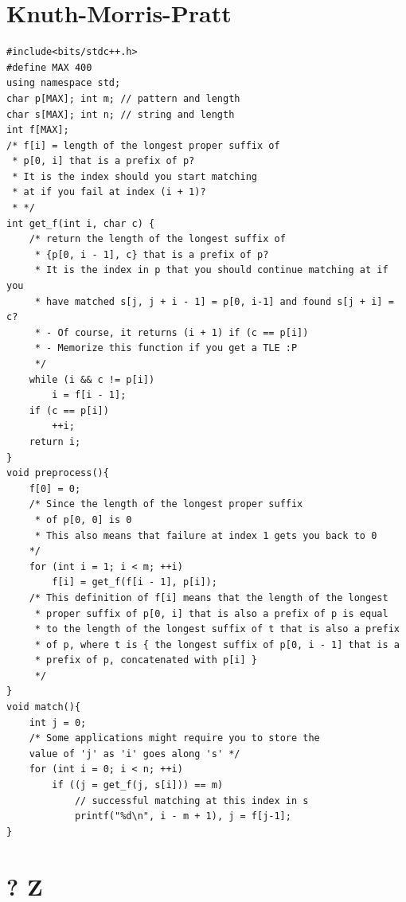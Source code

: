 \documentclass[12pt]{book}
\begin{document}
\section{Knuth-Morris-Pratt}
\begin{verbatim}
#include<bits/stdc++.h>
#define MAX 400
using namespace std;
char p[MAX]; int m;	// pattern and length
char s[MAX]; int n;	// string and length
int f[MAX];
/* f[i] = length of the longest proper suffix of
 * p[0, i] that is a prefix of p?
 * It is the index should you start matching
 * at if you fail at index (i + 1)?
 * */
int get_f(int i, char c) {
	/* return the length of the longest suffix of
	 * {p[0, i - 1], c} that is a prefix of p?
	 * It is the index in p that you should continue matching at if you
	 * have matched s[j, j + i - 1] = p[0, i-1] and found s[j + i] = c?
	 * - Of course, it returns (i + 1) if (c == p[i])
	 * - Memorize this function if you get a TLE :P
	 */
	while (i && c != p[i])
		i = f[i - 1];
	if (c == p[i])
		++i;
	return i;
}
void preprocess(){
	f[0] = 0;
	/* Since the length of the longest proper suffix
	 * of p[0, 0] is 0
	 * This also means that failure at index 1 gets you back to 0
	*/
	for (int i = 1; i < m; ++i)
		f[i] = get_f(f[i - 1], p[i]);
	/* This definition of f[i] means that the length of the longest
	 * proper suffix of p[0, i] that is also a prefix of p is equal
	 * to the length of the longest suffix of t that is also a prefix
	 * of p, where t is { the longest suffix of p[0, i - 1] that is a
	 * prefix of p, concatenated with p[i] }
	 */
}
void match(){
	int j = 0;
	/* Some applications might require you to store the
	value of 'j' as 'i' goes along 's' */
	for (int i = 0; i < n; ++i)
		if ((j = get_f(j, s[i])) == m)
			// successful matching at this index in s
			printf("%d\n", i - m + 1), j = f[j-1];
}
\end{verbatim}
\section{? Z}
\end{document}
